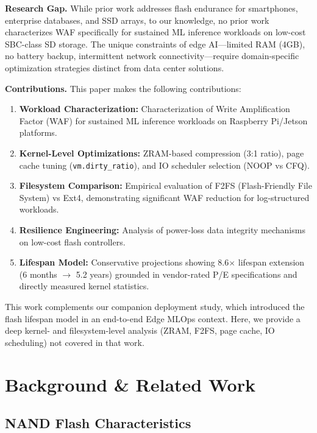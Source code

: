 \documentclass[conference]{IEEEtran}
\begin{document}
\textbf{Research Gap.} While prior work addresses flash endurance for smartphones, enterprise databases, and SSD arrays, to our knowledge, no prior work characterizes WAF specifically for sustained ML inference workloads on low-cost SBC-class SD storage. The unique constraints of edge AI---limited RAM (4GB), no battery backup, intermittent network connectivity---require domain-specific optimization strategies distinct from data center solutions.

\textbf{Contributions.} This paper makes the following contributions:

\begin{enumerate}
    \item \textbf{Workload Characterization:} Characterization of Write Amplification Factor (WAF) for sustained ML inference workloads on Raspberry Pi/Jetson platforms.
    \item \textbf{Kernel-Level Optimizations:} ZRAM-based compression (3:1 ratio), page cache tuning (\texttt{vm.dirty\_ratio}), and IO scheduler selection (NOOP vs CFQ).
    \item \textbf{Filesystem Comparison:} Empirical evaluation of F2FS (Flash-Friendly File System) vs Ext4, demonstrating significant WAF reduction for log-structured workloads.
    \item \textbf{Resilience Engineering:} Analysis of power-loss data integrity mechanisms on low-cost flash controllers.
    \item \textbf{Lifespan Model:} Conservative projections showing 8.6$\times$ lifespan extension (6 months $\to$ 5.2 years) grounded in vendor-rated P/E specifications and directly measured kernel statistics.
\end{enumerate}

This work complements our companion deployment study, which introduced the flash lifespan model in an end-to-end Edge MLOps context. Here, we provide a deep kernel- and filesystem-level analysis (ZRAM, F2FS, page cache, IO scheduling) not covered in that work.

\section{Background \& Related Work}

\subsection{NAND Flash Characteristics}
\end{document}
